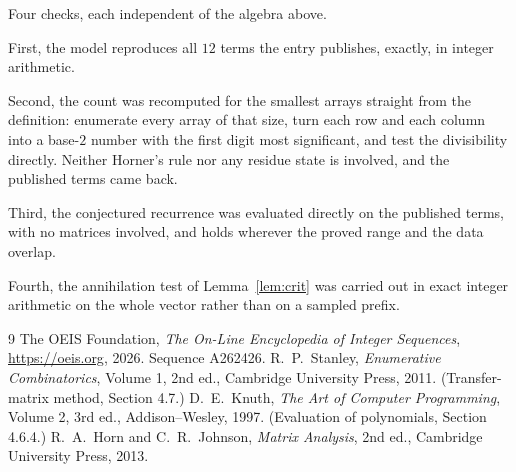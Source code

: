 \documentclass[11pt,a4paper]{article}
\theoremstyle{plain}
\theoremstyle{definition}
\begin{document}
Four checks, each independent of the algebra above.

First, the model reproduces all $12$ terms the entry publishes, exactly, in integer
arithmetic.

Second, the count was recomputed for the smallest arrays straight from the definition:
enumerate every array of that size, turn each row and each column into a base-$2$ number with
the first digit most significant, and test the divisibility directly. Neither Horner's rule nor
any residue state is involved, and the published terms came back.

Third, the conjectured recurrence was evaluated directly on the published terms, with no
matrices involved, and holds wherever the proved range and the data overlap.

Fourth, the annihilation test of Lemma~\ref{lem:crit} was carried out in exact integer
arithmetic on the whole vector rather than on a sampled prefix.

\begin{thebibliography}{9}
 The OEIS Foundation, \emph{The On-Line Encyclopedia of Integer
Sequences}, \url{https://oeis.org}, 2026. Sequence A262426.
 R.~P.~Stanley, \emph{Enumerative Combinatorics}, Volume 1, 2nd ed.,
Cambridge University Press, 2011. (Transfer-matrix method, Section 4.7.)
 D.~E.~Knuth, \emph{The Art of Computer Programming}, Volume 2, 3rd ed.,
Addison--Wesley, 1997. (Evaluation of polynomials, Section 4.6.4.)
 R.~A.~Horn and C.~R.~Johnson, \emph{Matrix Analysis}, 2nd ed., Cambridge
University Press, 2013.
\end{thebibliography}
\end{document}
